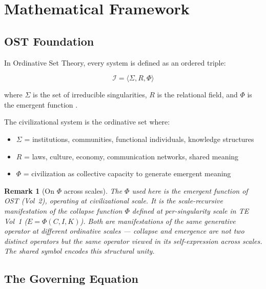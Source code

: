 \documentclass[12pt,a4paper]{article}
\newtheorem*{remark}{Remark}
\begin{document}
\section{Mathematical Framework}\label{sec:framework}

\subsection{OST Foundation}

In Ordinative Set Theory, every system is defined as an ordered triple:

\begin{equation}\label{eq:ost_triple}
\mathcal{I} = \langle \Sigma, R, \Phi \rangle
\end{equation}

\noindent where $\Sigma$ is the set of irreducible singularities, $R$ is the relational field, and $\Phi$ is the emergent function \cite{ost_v21}.

The civilizational system is the ordinative set where:
\begin{itemize}[leftmargin=2em]
    \item $\Sigma$ = institutions, communities, functional individuals, knowledge structures
    \item $R$ = laws, culture, economy, communication networks, shared meaning
    \item $\Phi$ = civilization as collective capacity to generate emergent meaning
\end{itemize}

\begin{remark}[On $\Phi$ across scales]
The $\Phi$ used here is the emergent function of OST (Vol~2), operating at civilizational scale. It is the scale-recursive manifestation of the collapse function $\Phi$ defined at per-singularity scale in TE Vol~1 ($E = \Phi(C, I, K)$). Both are manifestations of the same generative operator at different ordinative scales --- collapse and emergence are not two distinct operators but the same operator viewed in its self-expression across scales. The shared symbol encodes this structural unity.
\end{remark}

\subsection{The Governing Equation}
\end{document}
